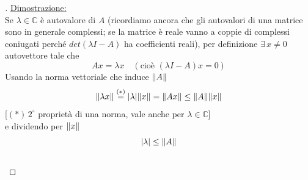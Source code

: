 \documentclass[12pt,a4paper]{article}
\DeclarePairedDelimiter{\abs}{\lvert}{\rvert}
\DeclarePairedDelimiter{\norma}{\lVert}{\rVert}
\begin{document}
\begin{proof}[\unskip\nopunct]
\uline{Dimostrazione:}\\
Se $\lambda \in \mathbb{C}$ è autovalore di $A$ (ricordiamo ancora che gli autovalori di una matrice sono in generale complessi; se la matrice è reale vanno a coppie di complessi coniugati perché $det(\lambda I-A)$ ha coefficienti reali), per definizione $\exists \, x \ne 0$ autovettore tale che
\[Ax = \lambda x \quad (\text{cioè } (\lambda I-A)x = 0)\]
Usando la norma vettoriale che induce $\norma{A}$
\[\norma{\lambda x} \overset{(*)}{=} \abs{\lambda}\norma{x} = \norma{Ax} \le \norma{A}\norma{x}\]
[$(*)\, 2^{\circ}$ proprietà di una norma, vale anche per $\lambda \in \mathbb{C}$] \\
e dividendo per $\norma{x}$
\[\abs{\lambda} \le \norma{A}\]\\
\end{proof}
\end{document}
